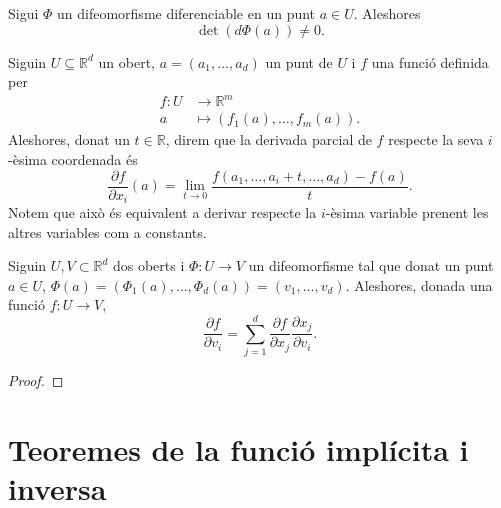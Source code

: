 \documentclass[../Apunts.tex]{subfiles}
\begin{document}
	\begin{corollary}\label{corollary:difeomorfime determinant}
		Sigui \(\Phi\) un difeomorfisme diferenciable en un punt \(a\in U\). Aleshores
		\[\det(d\Phi(a))\neq0.\]
	\end{corollary}
	\begin{definition}
		\label{def:Derivades parcials}
		Siguin \(U\subseteq\mathbb{R}^{d}\) un obert, \(a=(a_{1},\dots,a_{d})\) un punt de \(U\) i \(f\) una funció definida per
		\begin{align*}
		f\colon U&\longrightarrow\mathbb{R}^{m}\\
		a&\longmapsto(f_{1}(a),\dots,f_{m}(a)).
		\end{align*}
		Aleshores, donat un \(t\in\mathbb{R}\), direm que la derivada parcial de \(f\) respecte la seva \(i\)-èsima coordenada és
		\[\frac{\partial f}{\partial x_{i}}(a)=\lim_{t\to0}\frac{f(a_{1},\dots,a_{i}+t,\dots,a_{d})-f(a)}{t}.\]
		Notem que això és equivalent a derivar respecte la \(i\)-èsima variable prenent les altres variables com a constants.
	\end{definition}
	\begin{proposition}
		Siguin \(U,V\subset\mathbb{R}^{d}\) dos oberts i \(\Phi\colon U\to V\) un difeomorfisme tal que donat un punt \(a\in U\), \(\Phi(a)=(\Phi_{1}(a),\dots,\Phi_{d}(a))=(v_{1},\dots,v_{d})\). Aleshores, donada una funció \(f\colon U\to V\),\[\frac{\partial f}{\partial v_{i}}=\sum_{j=1}^{d}\frac{\partial f}{\partial x_{j}}\frac{\partial x_{j}}{\partial v_{i}}.\]		
		\begin{proof}
		\end{proof}
	\end{proposition}
	\section{Teoremes de la funció implícita i inversa}
\end{document}
